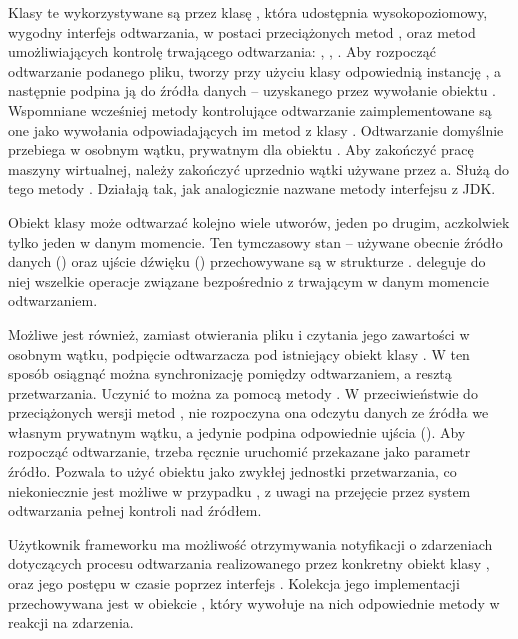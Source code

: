 Klasy te wykorzystywane są przez klasę , która udostępnia wysokopoziomowy, wygodny
interfejs odtwarzania, w postaci przeciążonych metod , oraz metod umożliwiających
kontrolę trwającego odtwarzania: , , . Aby rozpocząć odtwarzanie
podanego pliku,  tworzy przy użyciu klasy  odpowiednią instancję
, a następnie podpina ją do źródła danych -- uzyskanego przez wywołanie
 obiektu . Wspomniane wcześniej metody kontrolujące
odtwarzanie zaimplementowane są one jako wywołania odpowiadających im metod z klasy
. Odtwarzanie domyślnie przebiega w osobnym wątku, prywatnym dla obiektu
. Aby zakończyć pracę maszyny wirtualnej, należy zakończyć uprzednio wątki używane
przez a. Służą do tego metody . Działają tak, jak analogicznie nazwane
metody interfejsu  z JDK.

Obiekt klasy  może odtwarzać kolejno wiele utworów, jeden po drugim, aczkolwiek tylko
jeden w danym momencie. Ten tymczasowy stan -- używane obecnie źródło danych
() oraz ujście dźwięku () przechowywane są w strukturze
.  deleguje do niej wszelkie operacje związane bezpośrednio z
trwającym w danym momencie odtwarzaniem.

Możliwe jest również, zamiast otwierania pliku i czytania jego zawartości w osobnym wątku, podpięcie
odtwarzacza pod istniejący obiekt klasy . W ten sposób osiągnąć można
synchronizację pomiędzy odtwarzaniem, a resztą przetwarzania. Uczynić to można za pomocą metody
. W przeciwieństwie do przeciążonych wersji metod , nie rozpoczyna ona
odczytu danych ze źródła we własnym prywatnym wątku, a jedynie podpina odpowiednie ujścia
(). Aby rozpocząć odtwarzanie, trzeba ręcznie uruchomić przekazane jako parametr
źródło. Pozwala to użyć obiektu  jako zwykłej jednostki przetwarzania, co niekoniecznie
jest możliwe w przypadku , z uwagi na przejęcie przez system odtwarzania pełnej kontroli
nad źródłem.

Użytkownik frameworku ma możliwość otrzymywania notyfikacji o zdarzeniach dotyczących procesu
odtwarzania realizowanego przez konkretny obiekt klasy , oraz jego postępu w czasie
poprzez interfejs . Kolekcja jego implementacji przechowywana jest w obiekcie
, który wywołuje na nich odpowiednie metody w reakcji na zdarzenia.


